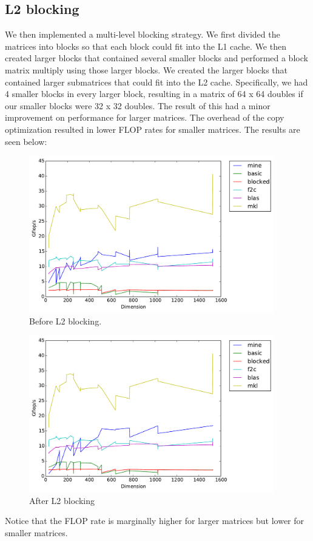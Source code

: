 \documentclass[11pt]{article}
\begin{document}
        \clearpage  
        

        \subsection{L2 blocking}

        We then implemented a multi-level blocking strategy. We first divided the matrices into blocks so that each block could fit into the L1 cache. We then created larger blocks that contained several smaller blocks and performed a block matrix multiply using those larger blocks. We created the larger blocks that contained larger submatrices that could fit into the L2 cache.  Specifically, we had 4 smaller blocks in every larger block, resulting in a matrix of 64 x 64 doubles if our smaller blocks were 32 x 32 doubles. The result of this had a minor improvement on performance for larger matrices. The overhead of the copy optimization resulted in lower FLOP rates for smaller matrices. The results are seen below:
        \begin{figure}[H]
            \centering
            \includegraphics[width=4.2in]{timing_noL2.pdf}
            \caption{Before L2 blocking.}
        \end{figure}

        \begin{figure}[H]
            \centering
            \includegraphics[width=4.2in]{timing_L2.pdf}
            \caption{After L2 blocking}
        \end{figure}
		Notice that the FLOP rate is marginally higher for larger matrices but lower for smaller matrices.
\end{document}
